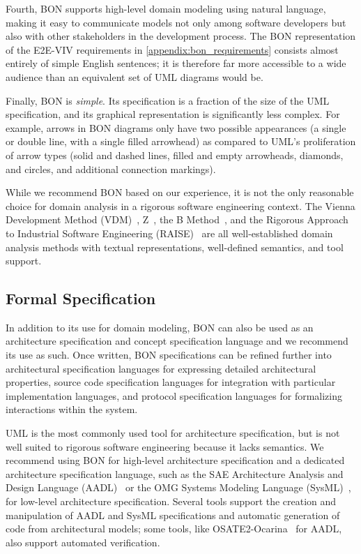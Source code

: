 Fourth, BON supports high-level domain modeling using natural
language, making it easy to communicate models not only among software
developers but also with other stakeholders in the development
process. The BON representation of the E2E-VIV requirements in
\autoref{appendix:bon_requirements} consists almost entirely of simple
English sentences; it is therefore far more accessible to a wide
audience than an equivalent set of UML diagrams would be.

Finally, BON is \emph{simple}. Its specification is a fraction of the
size of the UML specification, and its graphical representation is
significantly less complex. For example, arrows in BON diagrams only
have two possible appearances (a single or double line, with a single
filled arrowhead) as compared to UML's proliferation of arrow types
(solid and dashed lines, filled and empty arrowheads, diamonds, and
circles, and additional connection markings). 

While we recommend BON based on our experience, it is not the only
reasonable choice for domain analysis in a rigorous software
engineering context. The Vienna Development Method (VDM)~\cite{VDM},
Z~\cite{Zed}, the B Method~\cite{BMethod}, and the Rigorous Approach
to Industrial Software Engineering (RAISE)~\cite{RAISE} are all
well-established domain analysis methods with textual representations,
well-defined semantics, and tool support.

\subsection{Formal Specification}

In addition to its use for domain modeling, BON can also be used as an
architecture specification and concept specification language and we
recommend its use as such. Once written, BON specifications can be
refined further into architectural specification languages for
expressing detailed architectural properties, source code
specification languages for integration with particular implementation
languages, and protocol specification languages for formalizing
interactions within the system.

UML is the most commonly used tool for architecture specification, but
is not well suited to rigorous software engineering because it lacks
semantics. We recommend using BON for high-level architecture
specification and a dedicated architecture specification language,
such as the SAE Architecture Analysis and Design Language
(AADL)~\cite{AADL} or the OMG Systems Modeling Language
(SysML)~\cite{SysML}, for low-level architecture
specification. Several tools support the creation and manipulation of
AADL and SysML specifications and automatic generation of code from
architectural models; some tools, like
OSATE2-Ocarina~\cite{OSATE2-Ocarina} for AADL, also support automated
verification.

